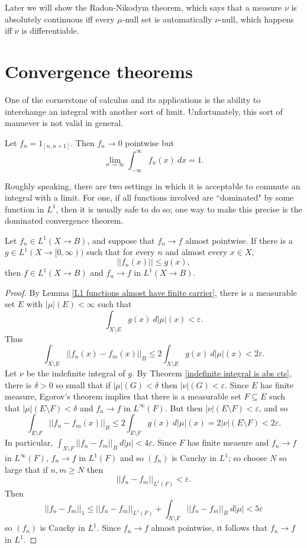 \begin{subsec}
Later we will show the Radon-Nikodym theorem, which says that a measure $\nu$ is absolutely continuous iff every $\mu$-null set is automatically $\nu$-null, which happens iff $\nu$ is differentiable.
\end{subsec}


\section{Convergence theorems}
One of the cornerstone of calculus and its applications is the ability to interchange an integral with another sort of limit.
Unfortunately, this sort of manuever is not valid in general.

\begin{example}
Let $f_n = 1_{[n, n + 1]}$. Then $f_n \to 0$ pointwise but
$$\lim_{n \to \infty} \int_{-\infty}^\infty f_n(x) ~dx = 1.$$
\end{example}

\begin{subsec}
Roughly speaking, there are two settings in which it is acceptable to commute an integral with a limit.
For one, if all functions involved are ``dominated" by some function in $L^1$, then it is usually safe to do so; one way to make this precise is the dominated convergence theorem.
\end{subsec}

\begin{theorem}
Let $f_n \in L^1(X \to B)$, and suppose that $f_n \to f$ almost pointwise. If there is a $g \in L^1(X \to [0, \infty))$ such that for every $n$ and almost every $x \in X$,
$$||f_n(x)|| \leq g(x),$$
then $f \in L^1(X \to B)$ and $f_n \to f$ in $L^1(X \to B)$.
\end{theorem}
\begin{proof}
By Lemma \ref{L1 functions almost have finite carrier}, there is a measurable set $E$ with $|\mu|(E) < \infty$ such that
$$\int_{X \setminus E} g(x) ~d|\mu|(x) < \varepsilon.$$
Thus
$$\int_{X \setminus E} ||f_n(x) - f_m(x)||_B \leq 2\int_{X \setminus E} g(x) ~d|\mu|(x) < 2\varepsilon.$$
Let $\nu$ be the indefinite integral of $g$.
By Theorem \ref{indefinite integral is abs cts}, there is $\delta > 0$ so small that if $|\mu|(G) < \delta$ then $|\nu|(G) < \varepsilon$.
Since $E$ has finite measure, Egorov's theorem implies that there is a measurable set $F \subseteq E$ such that $|\mu|(E \setminus F) < \delta$ and $f_n \to f$ in $L^\infty(F)$.
But then $|\nu|(E \setminus F) < \varepsilon$, and so
$$\int_{E \setminus F} ||f_n - f_m(x)||_B \leq 2\int_{E \setminus F} g(x) ~d|\mu|(x) = 2|\nu|(E \setminus F) < 2\varepsilon.$$
In particular, $\int_{X \setminus F} ||f_n - f_m||_B ~d|\mu| < 4\varepsilon$.
Since $F$ has finite measure and $f_n \to f$ in $L^\infty(F)$, $f_n \to f$ in $L^1(F)$ and so $(f_n)$ is Cauchy in $L^1$; so choose $N$ so large that if $n,m \geq N$ then
$$||f_n - f_m||_{L^1(F)} < \varepsilon.$$
Then
$$||f_n - f_m||_1 \leq ||f_n - f_m||_{L^1(F)} + \int_{X \setminus F} ||f_n - f_m||_B ~d|\mu| < 5\varepsilon$$
so $(f_n)$ is Cauchy in $L^1$.
Since $f_n \to f$ almost pointwise, it follows that $f_n \to f$ in $L^1$.
\end{proof}

